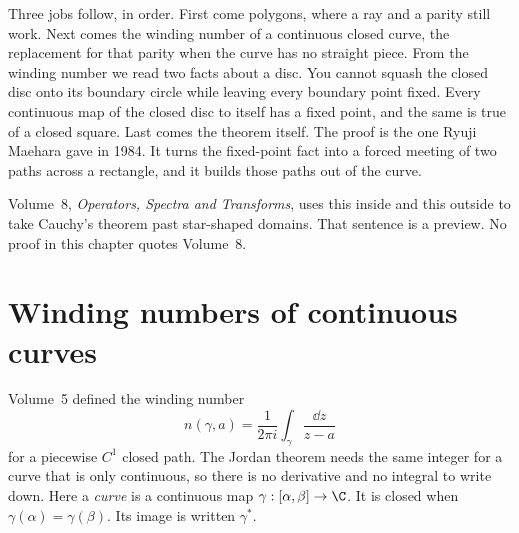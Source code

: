 Three jobs follow, in order. First come polygons, where a ray and a parity still work. Next comes the winding number of a continuous closed curve, the replacement for that parity when the curve has no straight piece. From the winding number we read two facts about a disc. You cannot squash the closed disc onto its boundary circle while leaving every boundary point fixed. Every continuous map of the closed disc to itself has a fixed point, and the same is true of a closed square. Last comes the theorem itself. The proof is the one Ryuji Maehara gave in 1984. It turns the fixed-point fact into a forced meeting of two paths across a rectangle, and it builds those paths out of the curve.

Volume~8, \emph{Operators, Spectra and Transforms}, uses this inside and this outside to take Cauchy's theorem past star-shaped domains. That sentence is a preview. No proof in this chapter quotes Volume~8.



\section{Winding numbers of continuous curves}

Volume~5 defined the winding number
\[
n(\gamma,a)=\frac1{2\pi i}\int_\gamma\frac{\dd z}{z-a}
\]
for a piecewise $C^1$ closed path. The Jordan theorem needs the same integer for a curve that is only continuous, so there is no derivative and no integral to write down. Here a \emph{curve} is a continuous map $\gamma:[\alpha,\beta]\to\C$. It is closed when $\gamma(\alpha)=\gamma(\beta)$. Its image is written $\gamma^*$.

